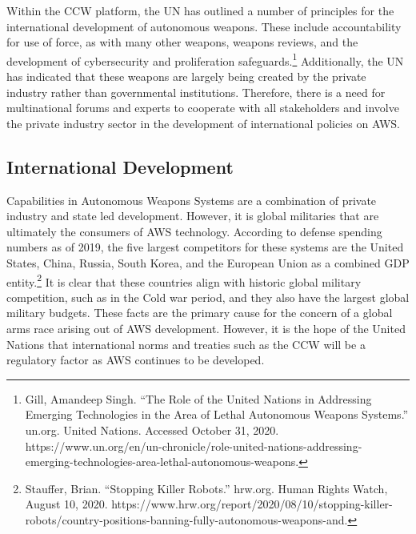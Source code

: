 \documentclass[10pt, letterpaper]{article}
\begin{document}
Within the CCW platform, the UN has outlined a number of principles for
the international development of autonomous weapons. These include
accountability for use of force, as with many other weapons, weapons
reviews, and the development of cybersecurity and proliferation
safeguards.\footnote{Gill, Amandeep Singh. ``The Role of the United
  Nations in Addressing Emerging Technologies in the Area of Lethal
  Autonomous Weapons Systems.'' un.org. United Nations. Accessed October
  31, 2020.
  https://www.un.org/en/un-chronicle/role-united-nations-addressing-emerging-technologies-area-lethal-autonomous-weapons.}
Additionally, the UN has indicated that these weapons are largely being
created by the private industry rather than governmental institutions.
Therefore, there is a need for multinational forums and experts to
cooperate with all stakeholders and involve the private industry sector
in the development of international policies on AWS. \\

\subsection{International Development}

Capabilities in Autonomous Weapons Systems are a combination of
private industry and state led development. However, it is global
militaries that are ultimately the consumers of AWS technology.
According to defense spending numbers as of 2019, the five largest
competitors for these systems are the United States, China, Russia,
South Korea, and the European Union as a combined GDP entity.\footnote{Stauffer,
  Brian. ``Stopping Killer Robots.'' hrw.org. Human Rights Watch, August
  10, 2020.
  https://www.hrw.org/report/2020/08/10/stopping-killer-robots/country-positions-banning-fully-autonomous-weapons-and.}
It is clear that these countries align with historic global military
competition, such as in the Cold war period, and they also have the
largest global military budgets. These facts are the primary cause for
the concern of a global arms race arising out of AWS development.
However, it is the hope of the United Nations that international norms
and treaties such as the CCW will be a regulatory factor as AWS
continues to be developed. \\
\end{document}
